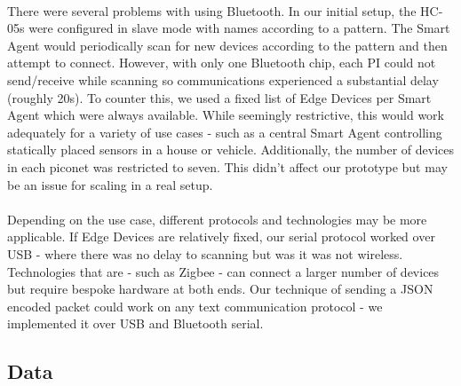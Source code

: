 \paragraph{}
There were several problems with using Bluetooth. In our initial setup, the HC-05s were configured in slave mode with names according to a pattern. The Smart Agent would periodically scan for new devices according to the pattern and then attempt to connect. However, with only one Bluetooth chip, each PI could not send/receive while scanning so communications experienced a substantial delay (roughly 20s). To counter this, we used a fixed list of Edge Devices per Smart Agent which were always available. While seemingly restrictive, this would work adequately for a variety of use cases - such as a central Smart Agent controlling statically placed sensors in a house or vehicle. Additionally, the number of devices in each piconet was restricted to seven. This didn't affect our prototype but may be an issue for scaling in a real setup.

\paragraph{}
Depending on the use case, different protocols and technologies may be more applicable. If Edge Devices are relatively fixed, our serial protocol worked over USB - where there was no delay to scanning but was it was not wireless. Technologies that are - such as Zigbee - can connect a larger number of devices but require bespoke hardware at both ends. Our technique of sending a JSON encoded packet could work on any text communication protocol - we implemented it over USB and Bluetooth serial.



\subsection{Data}





